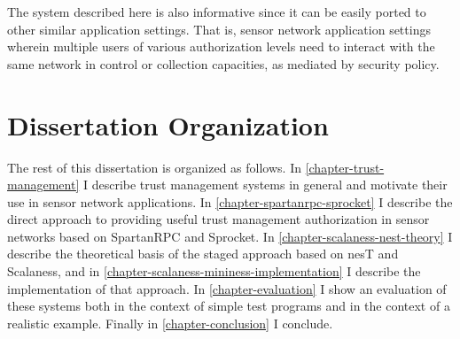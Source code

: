 The system described here is also informative since it can be easily ported to other similar
application settings. That is, sensor network application settings wherein multiple users of
various authorization levels need to interact with the same network in control or collection
capacities, as mediated by security policy.

\section{Dissertation Organization}

The rest of this dissertation is organized as follows. In \autoref{chapter-trust-management} I
describe trust management systems in general and motivate their use in sensor network
applications. In \autoref{chapter-spartanrpc-sprocket} I describe the direct approach to
providing useful trust management authorization in sensor networks based on SpartanRPC and
Sprocket. In \autoref{chapter-scalaness-nest-theory} I describe the theoretical basis of the
staged approach based on nesT and Scalaness, and in
\autoref{chapter-scalaness-mininess-implementation} I describe the implementation of that
approach. In \autoref{chapter-evaluation} I show an evaluation of these systems both in the
context of simple test programs and in the context of a realistic example. Finally in
\autoref{chapter-conclusion} I conclude.

